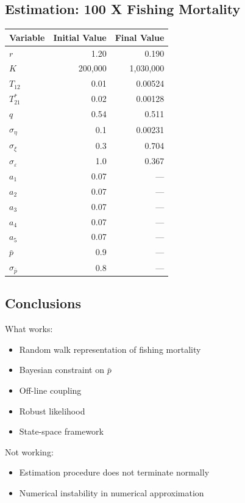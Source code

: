 \documentclass[a4paper,KOMA,landscape,titlepage]{powersem}
\begin{document}
\begin{slide}\section{Estimation: 100 X Fishing Mortality}
{\renewcommand{\arraystretch}{0.8}
\begin{center}
\begin{tabular}{lrr}
\hline
Variable & Initial Value & Final Value\\
\hline
$r$ & 1.20&  0.190\\
$K$ & 200,000 & 1,030,000 \\
$T_{12}$ & 0.01 & 0.00524\\
$T^*_{21}$& 0.02 & 0.00128\\
$q$ & 0.54 & 0.511\\
\hline
$\sigma_\eta$ & 0.1 & 0.00231\\
$\sigma_\xi$ & 0.3 & 0.704\\
$\sigma_\varepsilon$ & 1.0 & 0.367\\
$a_1$ & 0.07 & ---\\
$a_2$ & 0.07 & ---\\
$a_3$ & 0.07 & ---\\
$a_4$ & 0.07 & ---\\
$a_5$ & 0.07 & ---\\
\hline
$\bar{p}$ & 0.9 & ---\\
$\sigma_{\bar{p}}$ & 0.8 & ---\\
\hline
\end{tabular}
\end{center}
}
\end{slide}

\begin{slide}\section{Conclusions}
What works:
\begin{itemize}
\item Random walk representation of fishing mortality
\item Bayesian constraint on $\bar{p}$
\item Off-line coupling 
\item Robust likelihood
\item State-space framework
\end{itemize}
Not working:
\begin{itemize}
\item Estimation procedure does not terminate normally
\item Numerical instability in numerical approximation
\end{itemize}
\end{slide}
\end{document}
